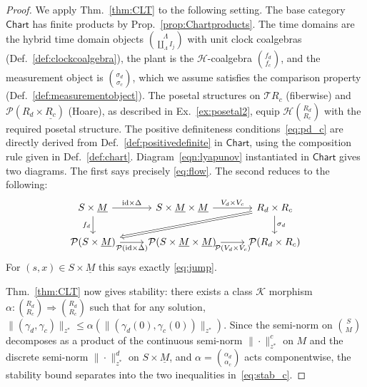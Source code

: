 \documentclass[letterpaper, 10 pt, conference]{IEEEconf}
\theoremstyle{definition}
\newcommand{\maps}{\colon}
\newcommand{\id}{\mathrm{id}}
\newcommand{\K}{\mathcal K}
\newcommand{\namedcat}[1]{\mathsf{#1}}
\newcommand{\Chart}{\namedcat{Chart}}
\newcommand{\functor}[1]{\mathcal{#1}}
\renewcommand{\H}{\functor{H}}
\renewcommand{\P}{\functor{P}}
\newcommand{\T}{\functor{T}}
\begin{document}
\begin{proof}
    We apply Thm.~\ref{thm:CLT} to the following setting. The base category $\Chart$ has finite products by Prop.~\ref{prop:Chartproducts}. The time domains are the hybrid time domain objects $\binom{\Lambda}{\coprod_\Lambda I_j}$ with unit clock coalgebras (Def.~\ref{def:clockcoalgebra}), the plant is the $\H$-coalgebra $\binom{f_d}{f_c}$, and the measurement object is $\binom{\sigma_d}{\sigma_c}$, which we assume satisfies the comparison property (Def.~\ref{def:measurementobject}). 
    The posetal structures on $\T R_c$ (fiberwise) and $\P(R_d \times \underline{R_c})$ (Hoare), as described in Ex.~\ref{ex:posetal2}, equip $\H\binom{R_d}{R_c}$ with the required posetal structure. The positive definiteness conditions~\eqref{eq:pd_c} are directly derived from Def.~\ref{def:positivedefinite} in $\Chart$, using the composition rule given in Def.~\ref{def:chart}.
    Diagram~\eqref{eqn:lyapunov} instantiated in $\Chart$ gives two diagrams. The first says precisely \eqref{eq:flow}. The second reduces to the following:
    \[\begin{tikzcd}
    	{S \times \underline M} & {S \times \underline M \times \underline M} & {R_d \times R_c} \\
    	{\P(S \times \underline M)} & {\P(S \times \underline M \times \underline M)} & {\P(R_d \times R_c)}
    	\arrow["{\id \times \Delta}", from=1-1, to=1-2]
    	\arrow["{f_d}"', from=1-1, to=2-1]
    	\arrow["{V_d\times V_c}", from=1-2, to=1-3]
    	\arrow[Rightarrow, from=1-3, to=2-1]
    	\arrow["{\sigma_d}", from=1-3, to=2-3]
    	\arrow["{\P(\id \times \Delta)}"', from=2-1, to=2-2]
    	\arrow["{\P(V_d \times V_c)}"', from=2-2, to=2-3]
    \end{tikzcd}\]
    For $(s,x) \in S \times \underline M$ this says exactly \eqref{eq:jump}.
    
    Thm.~\ref{thm:CLT} now gives stability: there exists a class $\K$ morphism $\alpha \maps \binom{R_d}{R_c} \Rightarrow \binom{R_d}{R_c}$ such that for any solution, $\|(\gamma_d, \gamma_c)\|_{z^*} \leq \alpha(\|(\gamma_d(0), \gamma_c(0))\|_{z^*})$. Since the semi-norm on $\binom{S}{M}$ decomposes as a product of the continuous semi-norm $\|\cdot\|^c_{z^*}$ on $M$ and the discrete semi-norm $\|\cdot\|^d_{z^*}$ on $S \times \underline{M}$, and $\alpha = \binom{\alpha_d}{\alpha_c}$ acts componentwise, the stability bound separates into the two inequalities in~\eqref{eq:stab_c}.
\end{proof}
\end{document}
